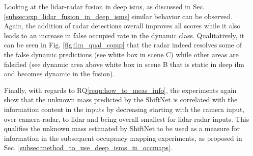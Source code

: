 Looking at the lidar-radar fusion in deep \gls{ism}s, as discussed in Sec. \ref{subsec:exp_lidar_fusion_in_deep_isms} similar behavior can be observed. Again, the addition of radar detections overall improves all scores while it also leads to an increase in false occupied rate in the dynamic class. Qualitatively, it can be seen in Fig. \ref{fig:ilm_qual_comp} that the radar indeed resolves some of the false dynamic predictions (see white box in scene C) while other areas are falsified (see dynamic area above white box in scene B that is static in deep \gls{ilm} and becomes dynamic in the fusion).

Finally, with regards to RQ\ref{requ:how_to_meas_info}, the experiments again show that the unknown mass predicted by the ShiftNet is correlated with the information content in the inputs by decreasing starting with the camera input, over camera-radar, to lidar and being overall smallest for lidar-radar inputs. This qualifies the unknown mass estimated by ShiftNet to be used as a measure for information in the subsequent occupancy mapping experiments, as proposed in Sec. \ref{subsec:method_to_use_deep_isms_in_occmaps}.